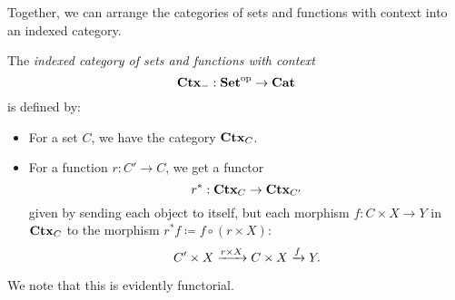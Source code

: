 \documentclass[DynamicalBook]{subfiles}
\begin{document}
Together, we can arrange the categories of sets and functions with context into
an indexed category.
\begin{definition}
  The \emph{indexed category of sets and functions with context}
  $$\textbf{Ctx}_{-} : \textbf{Set}^{\textnormal{op}} \to \textbf{Cat}$$
  is defined by:
  \begin{itemize}
    \item For a set $C$, we have the category $\textbf{Ctx}_{C}$.
    \item For a function $r : C' \to C$, we get a functor
      $$r^{\ast} : \textbf{Ctx}_{C} \to \textbf{Ctx}_{C'}$$
      given by sending each object to itself, but each morphism $f : C \times X
      \to Y$ in $\textbf{Ctx}_{C}$ to the morphism $r^{\ast}f \coloneqq f \circ (r \times X)$:
      $$C' \times X \xrightarrow{r \times X} C \times X \xrightarrow{f} Y.$$
  \end{itemize}
  We note that this is evidently functorial.
\end{definition}
\end{document}
